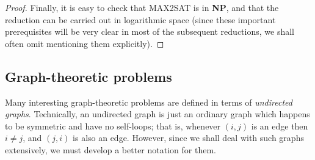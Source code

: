 \documentclass[12pt]{article}
\begin{document}
\begin{proof}
Finally, it is easy to check that \textsc{MAX2SAT} is in \textbf{NP}, and that the reduction can be carried out in logarithmic space (since these important prerequisites will be very clear in most of the subsequent reductions, we shall often omit mentioning them explicitly).
\end{proof}
\subsection{Graph-theoretic problems}
Many interesting graph-theoretic problems are defined in terms of \textit{undirected graphs}. Technically, an undirected graph is just an ordinary graph which happens to be symmetric and have no self-loops; that is, whenever $(i, j)$ is an edge then $i \neq j$, and $(j, i)$ is also an edge. However, since we shall deal with such graphs extensively, we must develop a better notation for them. 
\end{document}
